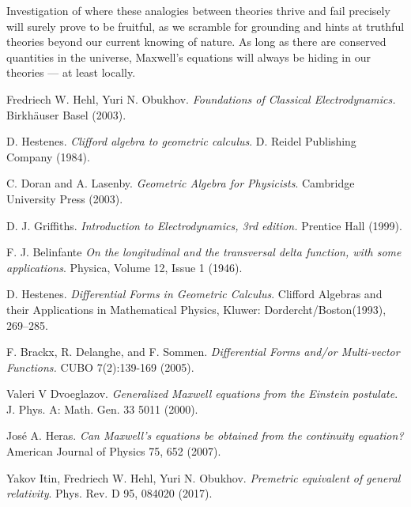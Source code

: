 \documentclass{article}
\begin{document}
Investigation of where these analogies between theories thrive and fail precisely will surely prove to be fruitful, as we scramble for grounding and hints at truthful theories beyond our current knowing of nature. As long as there are conserved quantities in the universe, Maxwell's equations will always be hiding in our theories --- at least locally.

\begin{thebibliography}{9}

    Fredriech W. Hehl, Yuri N. Obukhov.
    \emph{Foundations of Classical Electrodynamics.}
    Birkhäuser Basel (2003).

    D. Hestenes.
    \emph{Clifford algebra to geometric calculus}.
    D. Reidel Publishing Company (1984).
    
      C. Doran and A. Lasenby.
      \emph{Geometric Algebra for Physicists}. Cambridge University Press (2003).

      D. J. Griffiths.
      \emph{Introduction to Electrodynamics, 3rd edition.} 
      Prentice Hall (1999).       

    F. J. Belinfante
    \emph{On the longitudinal and the transversal delta function, with some applications}.
    Physica, Volume 12, Issue 1 (1946).

    D. Hestenes.
    \emph{Differential Forms in Geometric Calculus}.
    Clifford Algebras and their Applications in Mathematical Physics, 
    Kluwer: Dordercht/Boston(1993), 269–285.    

    F. Brackx, R. Delanghe, and F. Sommen.
    \emph{Differential Forms and/or Multi-vector Functions.}
    CUBO 7(2):139-169 (2005).    
    
    Valeri V Dvoeglazov. 
    \emph{Generalized Maxwell equations from the Einstein postulate}.
    J. Phys. A: Math. Gen. 33 5011 (2000).
    
    Jos\'e A. Heras.
    \emph{Can Maxwell’s equations be obtained from the continuity equation?}
    American Journal of Physics 75, 652 (2007).
    
    Yakov Itin, Fredriech W. Hehl, Yuri N. Obukhov.
    \emph{Premetric equivalent of general relativity}.
    Phys. Rev. D 95, 084020 (2017).

\end{thebibliography}
\end{document}
